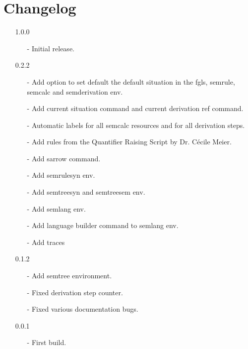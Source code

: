 \documentclass[10pt, a4paper]{article}
\begin{document}
	\section{Changelog}
	\begin{itemize}
		\item[1.0.0] 
		\begin{enumerate}
			\item[-] Initial release.
		\end{enumerate}
		\item[0.2.2] 
		\begin{enumerate}
			\item[-] Add option to set default the default situation in the fgls, semrule, semcalc and semderivation env.
			\item[-] Add current situation command and current derivation ref command.
			\item[-] Automatic labels for all semcalc resources and for all derivation steps.
			\item[-] Add rules from the Quantifier Raising Script by Dr. C\'{e}cile Meier.
			\item[-] Add sarrow command.
			\item[-] Add semrulesyn env.
			\item[-] Add semtreesyn and semtreesem env.
			\item[-] Add semlang env.
			\item[-] Add language builder command to semlang env.
			\item[-] Add traces
		\end{enumerate}
		\item[0.1.2] 
		\begin{enumerate}
			\item[-] Add semtree environment.
			\item[-] Fixed derivation step counter.
			\item[-] Fixed various documentation bugs.
		\end{enumerate}
		\item[0.0.1] 
		\begin{enumerate}
			\item[-] First build.
		\end{enumerate}
	\end{itemize}
	
\end{document}
